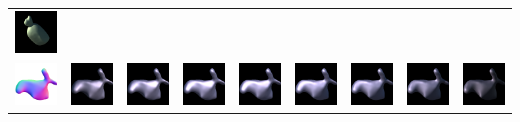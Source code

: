 \begin{center}
\begin{longtable}{@{}c@{}c@{}c@{}c@{}c@{}c@{}c@{}c@{}c@{}}
\includegraphics[width=0.1\linewidth]{training/18_7.png} \\
\includegraphics[width=0.1\linewidth]{training/19_gt.png} & \includegraphics[width=0.1\linewidth]{training/19_0.png} &
\includegraphics[width=0.1\linewidth]{training/19_1.png} & \includegraphics[width=0.1\linewidth]{training/19_2.png} &
\includegraphics[width=0.1\linewidth]{training/19_3.png} & \includegraphics[width=0.1\linewidth]{training/19_4.png} &
\includegraphics[width=0.1\linewidth]{training/19_5.png} & \includegraphics[width=0.1\linewidth]{training/19_6.png} &
\includegraphics[width=0.1\linewidth]{training/19_7.png} \\

\end{longtable}
\end{center}
